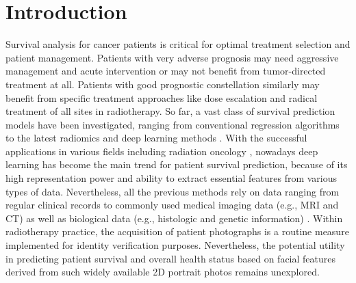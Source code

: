 \documentclass[runningheads]{llncs}
\begin{document}
\section{Introduction}
Survival analysis for cancer patients is critical for optimal treatment selection and patient management. Patients with very adverse prognosis may need aggressive management and acute intervention or may not benefit from tumor-directed treatment at all. Patients with good prognostic constellation similarly may benefit from specific treatment approaches like dose escalation and radical treatment of all sites in radiotherapy. So far, a vast class of survival prediction models have been investigated, ranging from conventional regression algorithms \cite{emura2012survival,kidd2018survival} to the latest radiomics \cite{van2017survival,chen2022mri} and deep learning methods \cite{wang2021cox,katzman2018deepsurv,kim2019deep,wankhede2022dynamic}.
With the successful applications in various fields including radiation oncology \cite{huang2022deep,weissmann2023deep,huang2023benchmarking,putz2023segment}, nowadays deep learning has become the main trend for patient survival prediction, because of its high representation power and ability to extract essential features from various types of data. Nevertheless, all the previous methods rely on data ranging from regular clinical records to commonly used medical imaging data (e.g., MRI and CT) as well as biological data (e.g., histologic and genetic information) \cite{vale2021long}. 
Within radiotherapy practice, the acquisition of patient photographs is a routine measure implemented for identity verification purposes.
Nevertheless, the potential utility in predicting patient survival and overall health status based on facial features derived from such widely available 2D portrait photos remains unexplored.
\end{document}
